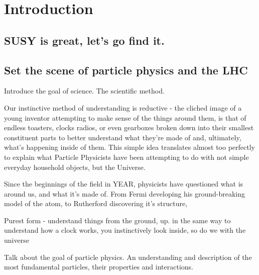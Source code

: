 
\chapter{Introduction}  %

\ifpdf
    \graphicspath{{Chapter1/Figs/Raster/}{Chapter1/Figs/PDF/}{Chapter1/Figs/}}
\else
    \graphicspath{{Chapter1/Figs/Vector/}{Chapter1/Figs/}}
\fi


\section{SUSY is great, let's go find it.}  %
\label{sec:introduction_intro}

\section{Set the scene of particle physics and the LHC}

Introduce the goal of science. The scientific method.

Our instinctive method of understanding is reductive - the cliched image of a
young inventor attempting to make sense of the things around them, is
that of endless toasters, clocks radios, or even gearboxes broken down into
their smallest constituent parts to better understand what they're made of and,
ultimately, what's happening inside of them. This simple idea translates almost
too perfectly to explain what Particle Physicists have been attempting to do
with not simple everyday household objects, but the Universe.

Since the beginnings of the field in YEAR, physicists have questioned
what is
around us, and what it's made of. From Fermi developing his ground-breaking
model of the atom, to Rutherford discovering it's structure, 

Purest form - understand things from the ground, up.
    in the same way to understand how a clock works, you instinctively look
    inside, so do we with the universe

Talk about the goal of particle physics.
    An understanding and description of the most fundamental particles, their 
    properties and interactions.

